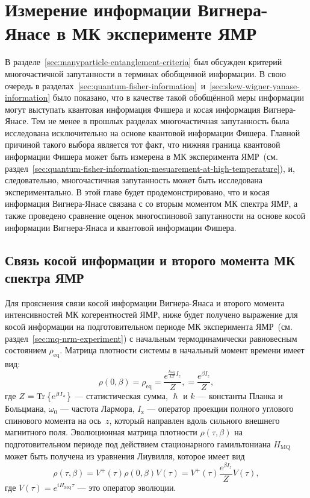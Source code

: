 \chapter{Измерение информации Вигнера-Янасе в МК эксперименте ЯМР}
\label{chapter:wyi-mesuarement}


В разделе~\ref{sec:manyparticle-entanglement-criteria} был обсужден критерий многочастичной запутанности
в терминах обобщенной информации.
В свою очередь в разделах~\ref{sec:quantum-fisher-information}~и~\ref{sec:skew-wigner-yanase-information}
было показано,
что в качестве такой обобщённой меры информации могут выступать
квантовая информация Фишера и косая информация Вигнера-Янасе.
Тем не менее в прошлых разделах многочастичная запутанность была исследована исключительно
на основе квантовой информации Фишера.
Главной причиной такого выбора является тот факт,
что нижняя граница квантовой информации Фишера может быть измерена в МК эксперимента ЯМР~(см.  раздел~\ref{sec:quantum-fisher-information-mesuarement-at-high-temperature}),
и, следовательно, многочастичная запутанность может быть исследована экспериментально.
В этой главе будет продемонстрировано,
что и косая информация Вигнера-Янасе связана с
со вторым моментом МК спектра ЯМР,
а также проведено сравнение оценок многоспиновой запутанности
на основе косой информации Вигнера-Янаса и квантовой информации Фишера.



\section{Связь косой информации и второго момента МК спектра ЯМР}
\label{sec:wyi-mesuarement}

Для прояснения связи косой информации Вигнера-Янаса и
второго момента интенсивностей МК когерентностей ЯМР,
ниже будет получено выражение для косой информации
на подготовительном периоде МК эксперимента ЯМР~(см. раздел~\ref{sec:mq-nrm-experiment})
с начальным термодинамически равновесным состоянием $\rho_\mathrm{eq}$.
Матрица плотности системы в начальный момент времени имеет вид:
\begin{equation}
  \rho(0, \beta)
  = \rho_\mathrm{eq}
  = \dfrac{e^{\frac{\hbar\omega_{0}}{kT} I_z}}{Z},
  = \dfrac{e^{\beta I_z}}{Z},
\end{equation}
где $Z = \mathrm{Tr} \left\{ e^{\beta I_z} \right\}$ --- статистическая сумма,
$\hslash$ и $k$ --- константы Планка и Больцмана,
$\omega_{0}$ --- частота Лармора,
$I_\mathrm{z}$ ---  оператор проекции полного углового спинового момента  на ось~$z$,
который направлен вдоль сильного внешнего магнитного поля.
Эволюционная матрица плотности $\rho(\tau,\beta)$ на подготовительном периоде
под действием стационарного гамильтониана $H_\mathrm{MQ}$
может быть получена из уравнения Лиувилля,
которое имеет вид
%
\begin{equation}\label{eq:rho-eval}
  \rho(\tau,\beta)
  = V^+(\tau) \rho(0, \beta) V(\tau)
  = V^+(\tau) \frac{e^{\beta I_z}}{Z} V(\tau),
\end{equation}
где $V(\tau) = e^{iH_\mathrm{MQ}\tau}$
--- это оператор эволюции.

